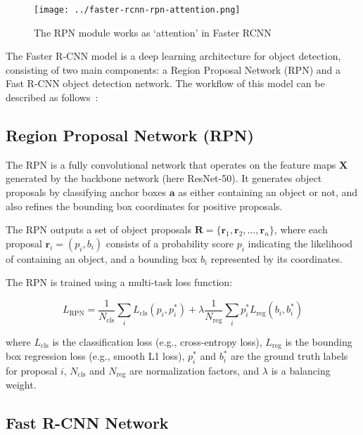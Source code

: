 \documentclass[12pt,oneside]{book} %
\begin{document}
\begin{figure}[H]
    \centering
    \texttt{[image: ../faster-rcnn-rpn-attention.png]}
    \caption{The RPN module works as `attention' in Faster RCNN~\cite{fasterrnn}}
    \label{fig:faster-rpn}
\end{figure}

The Faster R-CNN model is a deep learning architecture for object detection,
consisting of two main components: a Region Proposal Network (RPN) and a Fast
R-CNN object detection network. The workflow of this model can be described as
follows~\cite{PyTorchFasterRCNNResNet50FPNV2}:

\subsection{Region Proposal Network (RPN)}

The RPN is a fully convolutional network that operates on the feature maps
$\mathbf{X}$ generated by the backbone network (here ResNet-50). It generates
object proposals by classifying anchor boxes $\mathbf{a}$ as either containing
an object or not, and also refines the bounding box coordinates for positive
proposals.

The RPN outputs a set of object proposals $\mathbf{R} = \{\mathbf{r}_1,
    \mathbf{r}_2, \ldots, \mathbf{r}_n\}$, where each proposal $\mathbf{r}_i =
    (p_i, b_i)$ consists of a probability score $p_i$ indicating the likelihood of
containing an object, and a bounding box $b_i$ represented by its coordinates.

The RPN is trained using a multi-task loss function:

\begin{equation}
    L_{\text{RPN}} = \frac{1}{N_{\text{cls}}} \sum_{i} L_{\text{cls}}(p_i, p_i^*) + \lambda \frac{1}{N_{\text{reg}}} \sum_{i} p_i^* L_{\text{reg}}(b_i, b_i^*)
\end{equation}

where $L_{\text{cls}}$ is the classification loss (e.g., cross-entropy loss),
$L_{\text{reg}}$ is the bounding box regression loss (e.g., smooth L1 loss),
$p_i^*$ and $b_i^*$ are the ground truth labels for proposal $i$,
$N_{\text{cls}}$ and $N_{\text{reg}}$ are normalization factors, and $\lambda$
is a balancing weight.

\subsection{Fast R-CNN Network}
\end{document}
